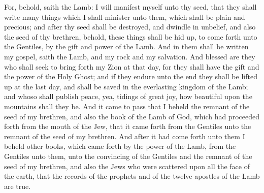 For, behold, saith the Lamb: I will manifest myself unto thy seed, that they shall write many things which I shall minister unto them, which shall be plain and precious; and after thy seed shall be destroyed, and dwindle in unbelief, and also the seed of thy brethren, behold, these things shall be hid up, to come forth unto the Gentiles, by the gift and power of the Lamb.
\bverse \iffalse And in them shall be written my gospel, saith the Lamb, and my rock and my salvation. \fi
And in them shall be written my gospel, saith the Lamb, and my rock and my salvation.
\bverse \iffalse And blessed are they who shall seek to bring forth my Zion at that day, for they shall have the gift and the power of the Holy Ghost; and if they endure unto the end they shall be lifted up at the last day, and shall be saved in the everlasting kingdom of the Lamb; and whoso shall publish peace, yea, tidings of great joy, how beautiful upon the mountains shall they be. \fi
And blessed are they who shall seek to bring forth my Zion at that day, for they shall have the gift and the power of the Holy Ghost; and if they endure unto the end they shall be lifted up at the last day, and shall be saved in the everlasting kingdom of the Lamb; and whoso shall publish peace, yea, tidings of great joy, how beautiful upon the mountains shall they be.
\bverse \iffalse And it came to pass that I beheld the remnant of the seed of my brethren, and also the book of the Lamb of God, which had proceeded forth from the mouth of the Jew, that it came forth from the Gentiles unto the remnant of the seed of my brethren. \fi
And it came to pass that I beheld the remnant of the seed of my brethren, and also the book of the Lamb of God, which had proceeded forth from the mouth of the Jew, that it came forth from the Gentiles unto the remnant of the seed of my brethren.
\bverse \iffalse And after it had come forth unto them I beheld other books, which came forth by the power of the Lamb, from the Gentiles unto them, unto the convincing of the Gentiles and the remnant of the seed of my brethren, and also the Jews who were scattered upon all the face of the earth, that the records of the prophets and of the twelve apostles of the Lamb are true. \fi
And after it had come forth unto them I beheld other books, which came forth by the power of the Lamb, from the Gentiles unto them, unto the convincing of the Gentiles and the remnant of the seed of my brethren, and also the Jews who were scattered upon all the face of the earth, that the records of the prophets and of the twelve apostles of the Lamb are true.
